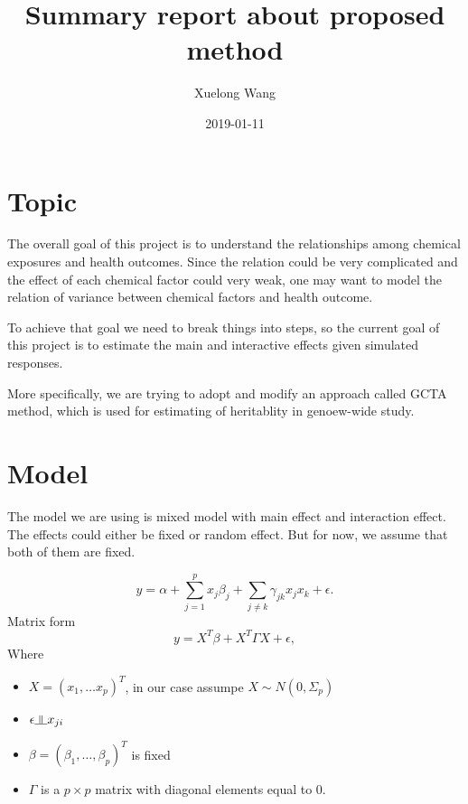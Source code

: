 \documentclass[]{article}
\title{Summary report about proposed method}
\author{Xuelong Wang}
\date{2019-01-11}
\providecommand{\tightlist}{%
  \setlength{\itemsep}{0pt}\setlength{\parskip}{0pt}}
\newcommand{\indep}{\rotatebox[origin=c]{90}{$\models$}}
\begin{document}
\maketitle

{
\setcounter{tocdepth}{2}
\tableofcontents
}
\section{Topic}\label{topic}

The overall goal of this project is to understand the relationships
among chemical exposures and health outcomes. Since the relation could
be very complicated and the effect of each chemical factor could very
weak, one may want to model the relation of variance between chemical
factors and health outcome.

To achieve that goal we need to break things into steps, so the current
goal of this project is to estimate the main and interactive effects
given simulated responses.

More specifically, we are trying to adopt and modify an approach called
GCTA method, which is used for estimating of heritablity in genoew-wide
study.

\section{Model}\label{model}

The model we are using is mixed model with main effect and interaction
effect. The effects could either be fixed or random effect. But for now,
we assume that both of them are fixed.

\[
  y = \alpha + \sum_{j = 1}^p x_j\beta_j + \sum_{j \neq k} \gamma_{jk}x_jx_k + \epsilon.
\] Matrix form \[
  y = X^T\beta + X^T\Gamma X + \epsilon,
\] Where

\begin{itemize}
\tightlist
\item
  \(X = (x_{1}, \dots x_{p})^T\), in our case assumpe
  \(X \sim N(0, \Sigma_p)\)\\
\item
  \(\epsilon \indep x_{ji}\)\\
\item
  \(\beta = (\beta_1, \dots, \beta_p)^T\) is fixed\\
\item
  \(\Gamma\) is a \(p \times p\) matrix with diagonal elements equal to
  0.
\end{itemize}
\end{document}
